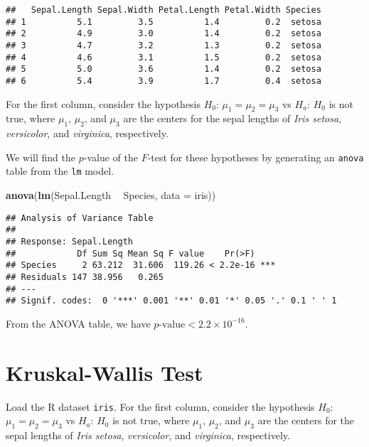 \documentclass[
]{book}
\newenvironment{Shaded}{\begin{snugshade}}{\end{snugshade}}
\newcommand{\DataTypeTok}[1]{\textcolor[rgb]{0.13,0.29,0.53}{#1}}
\newcommand{\KeywordTok}[1]{\textcolor[rgb]{0.13,0.29,0.53}{\textbf{#1}}}
\newcommand{\NormalTok}[1]{#1}
\newcommand{\OperatorTok}[1]{\textcolor[rgb]{0.81,0.36,0.00}{\textbf{#1}}}
\newcommand{\StringTok}[1]{\textcolor[rgb]{0.31,0.60,0.02}{#1}}
\begin{document}
\begin{verbatim}
##   Sepal.Length Sepal.Width Petal.Length Petal.Width Species
## 1          5.1         3.5          1.4         0.2  setosa
## 2          4.9         3.0          1.4         0.2  setosa
## 3          4.7         3.2          1.3         0.2  setosa
## 4          4.6         3.1          1.5         0.2  setosa
## 5          5.0         3.6          1.4         0.2  setosa
## 6          5.4         3.9          1.7         0.4  setosa
\end{verbatim}

For the first column, consider the hypothesis
\(H_0\): \(\mu_1 = \mu_2 = \mu_3\) vs \(H_a\): \(H_0\) is not true,
where \(\mu_1\), \(\mu_2\), and \(\mu_3\)
are the centers for the sepal lengths of
\emph{Iris setosa}, \emph{versicolor}, and \emph{virginica}, respectively.

We will find the \(p\)-value of the \(F\)-test for these hypotheses
by generating an \texttt{anova} table from the \texttt{lm} model.

\begin{Shaded}
\begin{Highlighting}[]
\KeywordTok{anova}\NormalTok{(}\KeywordTok{lm}\NormalTok{(Sepal.Length }\OperatorTok{~}\StringTok{ }\NormalTok{Species, }\DataTypeTok{data =}\NormalTok{ iris))}
\end{Highlighting}
\end{Shaded}

\begin{verbatim}
## Analysis of Variance Table
## 
## Response: Sepal.Length
##            Df Sum Sq Mean Sq F value    Pr(>F)    
## Species     2 63.212  31.606  119.26 < 2.2e-16 ***
## Residuals 147 38.956   0.265                      
## ---
## Signif. codes:  0 '***' 0.001 '**' 0.01 '*' 0.05 '.' 0.1 ' ' 1
\end{verbatim}

From the ANOVA table, we have \(p\text{-value} < 2.2 \times 10^{-16}\).

\hypertarget{kruskal-wallis-test}{%
\section{Kruskal-Wallis Test}\label{kruskal-wallis-test}}

Load the R dataset \texttt{iris}.
For the first column, consider the hypothesis
\(H_0\): \(\mu_1 = \mu_2 = \mu_3\) vs \(H_a\): \(H_0\) is not true,
where \(\mu_1\), \(\mu_2\), and \(\mu_3\)
are the centers for the sepal lengths of
\emph{Iris setosa}, \emph{versicolor}, and \emph{virginica}, respectively.
\end{document}
